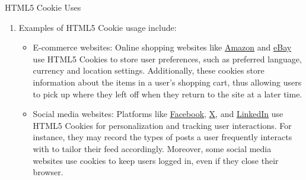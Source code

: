 \documentclass[pdf]{beamer}
\theoremstyle{remark}
\theoremstyle{definition}
\begin{document}
\begin{frame}[t]{HTML5 Cookie Uses}
\small
\begin{enumerate}
\item [] Examples of HTML5 Cookie usage include: \\
\vspace{1.5ex}
\begin{itemize}
  \item E-commerce websites: Online shopping websites like \href{https://www.amazon.com/}{Amazon} and \href{https://www.ebay.com/}{eBay} use HTML5 Cookies to store user preferences, such as preferred language, currency and location settings. Additionally, these cookies store information about the items in a user's shopping cart, thus allowing users to pick up where they left off when they return to the site at a later time.
  \item Social media websites: Platforms like \href{https://www.facebook.com/}{Facebook}, \href{https://twitter.com/}{X}, and \href{https://www.linkedin.com/}{LinkedIn} use HTML5 Cookies for personalization and tracking user interactions. For instance, they may record the types of posts a user frequently interacts with to tailor their feed accordingly. Moreover, some social media websites use cookies to keep users logged in, even if they close their browser.
\end{itemize}
\end{enumerate}
\end{frame}
\end{document}
